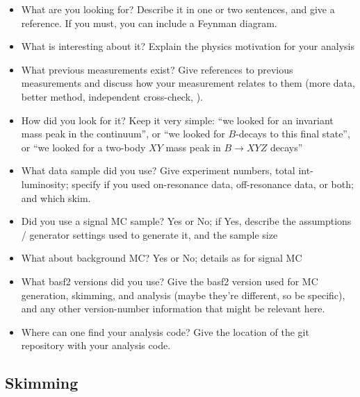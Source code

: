 \begin{itemize}
\item What are you looking for?
Describe it in one or two sentences, and give a reference.
If you must, you can include a Feynman diagram.

\item What is interesting about it?
Explain the physics motivation for your analysis

\item What previous measurements exist?
Give references to previous measurements and discuss
how your measurement relates to them (\eg more data,
better method, independent cross-check, \etc).

\item How did you look for it?
Keep it very simple: \eg ``we looked for an invariant mass peak in the
 continuum'', or ``we looked for $B$-decays to this final state'', or
``we looked for a two-body $XY$ mass peak in $B \to XYZ$ decays''

\item What data sample did you use?
Give experiment numbers, total int-luminosity;
specify if you used on-resonance data, off-resonance data, or both;
and which skim.

\item Did you use a signal MC sample?
Yes or No;
if Yes, describe the assumptions / generator settings
used to generate it, and the sample size

\item What about background MC?
Yes or No; details as for signal MC

\item What basf2 versions did you use?
Give the basf2 version used for MC generation, skimming, and
analysis (maybe they're different, so be specific), and any other
version-number information that might be relevant here.

\item Where can one find your analysis code?
Give the location of the git repository with your analysis code.
\end{itemize}

\subsection*{Skimming}


